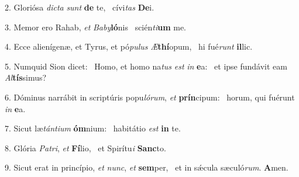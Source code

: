 2. Gloriósa \textit{dic}\textit{ta} \textit{sunt} \textbf{de} te, \ast\  cívi\textit{tas} \textbf{De}i.\

3. Memor ero Rahab, \textit{et} \textit{Ba}\textit{by}\textbf{ló}nis \ast\  scién\textit{ti}\textbf{um} me.\

4. Ecce alienígenæ, et Tyrus, et pó\textit{pu}\textit{lus} \textit{Æ}\textbf{thí}opum, \ast\  hi fué\textit{runt} \textbf{il}lic.\

5. Numquid Sion dicet: \dag\  Homo, et homo na\textit{tus} \textit{est} \textit{in} \textbf{e}a: \ast\  et ipse fundávit eam \textit{Al}\textbf{tís}simus?\

6. Dóminus narrábit in scriptúris popu\textit{ló}\textit{rum}, \textit{et} \textbf{prín}cipum: \ast\  horum, qui fuérunt \textit{in} \textbf{e}a.\

7. Sicut læ\textit{tán}\textit{ti}\textit{um} \textbf{óm}nium: \ast\  habitátio \textit{est} \textbf{in} te.\

8. Glória \textit{Pa}\textit{tri}, \textit{et} \textbf{Fí}lio, \ast\  et Spirítu\textit{i} \textbf{Sanc}to.\

9. Sicut erat in princípio, \textit{et} \textit{nunc}, \textit{et} \textbf{sem}per, \ast\  et in sǽcula sæculó\textit{rum}. \textbf{A}men.\

